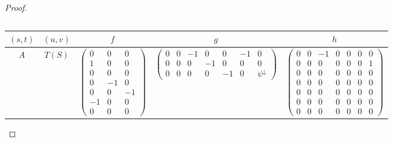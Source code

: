\documentclass[11pt]{amsart}
\theoremstyle{definition}
\theoremstyle{remark}
\numberwithin{equation}{section}
\begin{document}
\begin{proof}
\begin{table}
\begin{tabular}{c|c|c|c|c}
	\\ 
	\end{tabular}\end{table}\begin{table}\begin{tabular}{c|c|c|c|c} 
	$(s,t)$ & $(u,v)$ & $f$ & $g$ & $h$\\  \hline $A$ & $T(S)$ & $\left(\begin{array}{ccc} 0 & 0 & 0 \\ 1 & 0 & 0 \\ 0 & 0 & 0 \\ 0 & -1 & 0 \\ 0 & 0 & -1 \\ -1 & 0 & 0 \\ 0 & 0 & 0\end{array}\right)$ & $\left(\begin{array}{ccccccc} 0 & 0 & -1 & 0 & 0 & -1 & 0 \\ 0 & 0 & 0 & -1 & 0 & 0 & 0 \\ 0 & 0 & 0 & 0 & -1 & 0 & \psi^{\downarrow}\end{array}\right)$ & $\left(\begin{array}{ccccccc} 0 & 0 & -1 & 0 & 0 & 0 & 0 \\ 0 & 0 & 0 & 0 & 0 & 0 & 1 \\ 0 & 0 & 0 & 0 & 0 & 0 & 0 \\ 0 & 0 & 0 & 0 & 0 & 0 & 0 \\ 0 & 0 & 0 & 0 & 0 & 0 & 0 \\ 0 & 0 & 0 & 0 & 0 & 0 & 0 \\ 0 & 0 & 0 & 0 & 0 & 0 & 0\end{array}\right)$ \\ \hline 

\end{tabular}
\end{table}
\end{proof}
\end{document}
